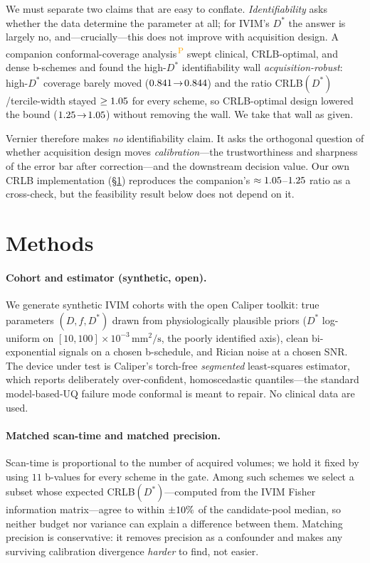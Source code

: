 \documentclass[11pt]{article}
\newcommand{\PROV}{\textsuperscript{\textcolor{orange}{\,P}}}
\newcommand{\Dstar}{D^{*}}
\begin{document}
We must separate two claims that are easy to conflate. \emph{Identifiability} asks
whether the data determine the parameter at all; for IVIM's $\Dstar$ the answer is
largely no, and---crucially---this does not improve with acquisition design. A
companion conformal-coverage analysis\PROV{} swept clinical, CRLB-optimal, and dense
b-schemes and found the high-$\Dstar$ identifiability wall \emph{acquisition-robust}:
high-$\Dstar$ coverage barely moved ($0.841\!\to\!0.844$) and the
ratio CRLB$(\Dstar)$/tercile-width stayed $\ge1.05$ for every scheme, so
CRLB-optimal design lowered the bound ($1.25\!\to\!1.05$) without
removing the wall. We take that wall as given.

Vernier therefore makes \emph{no} identifiability claim. It asks the orthogonal
question of whether acquisition design moves \emph{calibration}---the trustworthiness
and sharpness of the error bar after correction---and the downstream decision value.
Our own CRLB implementation (\S\ref{sec:methods}) reproduces the companion's
$\approx1.05$--$1.25$ ratio as a cross-check, but the feasibility
result below does not depend on it.

\section{Methods}
\label{sec:methods}

\paragraph{Cohort and estimator (synthetic, open).}
We generate synthetic IVIM cohorts with the open Caliper toolkit: true parameters
$(D,f,\Dstar)$ drawn from physiologically plausible priors ($\Dstar$ log-uniform on
$[10,100]\times10^{-3}\,\mathrm{mm}^2/\mathrm{s}$, the poorly identified axis), clean
bi-exponential signals on a chosen b-schedule, and Rician noise at a chosen SNR. The
device under test is Caliper's torch-free \emph{segmented} least-squares estimator,
which reports deliberately over-confident, homoscedastic quantiles---the standard
model-based-UQ failure mode conformal is meant to repair. No clinical data are used.

\paragraph{Matched scan-time and matched precision.}
Scan-time is proportional to the number of acquired volumes; we hold it fixed by using
$11$ b-values for every scheme in the gate. Among such schemes we select a subset whose
expected CRLB$(\Dstar)$---computed from the IVIM Fisher information matrix---agree to
within $\pm10\%$ of the candidate-pool median, so neither budget nor
variance can explain a difference between them. Matching precision is conservative: it
removes precision as a confounder and makes any surviving calibration divergence
\emph{harder} to find, not easier.
\end{document}
